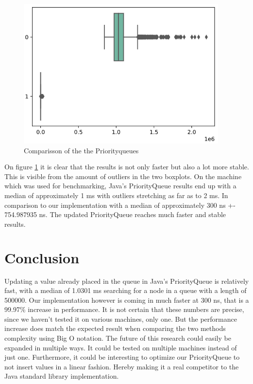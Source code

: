 \documentclass{article}
\begin{document}
\begin{figure}[H]
\includegraphics[width=300pt]{boxplot_comparisson}
\caption{Comparisson of the the Priorityqueues}
\label{img:boxplot_comparisson}
\end{figure}

On figure \ref{img:boxplot_comparisson} it is clear that the results is not only faster 
but also a lot more stable. This is visible from the amount of outliers in the two boxplots. 
On the machine which was used for benchmarking, Java's PriorityQueue results end up with a
median of approximately 1 ms with outliers stretching as far as to 2 ms. In comparison to 
our implementation with a median of approximately 300 ns +- 754.987935 ns. The updated 
PriorityQueue reaches much faster and stable results.  

\section{Conclusion} %
Updating a value already placed in the queue in Java's PriorityQueue is relatively
fast, with a median of 1.0301 ms searching for a node in a queue with a length of 
500000. Our implementation however is coming in much faster at 300 ns, that is a 99.97\% 
increase in performance. It is not certain that these numbers are precise, since we haven't 
tested it on various machines, only one. But the performance increase does match the expected result 
when comparing the two methods complexity using Big O notation. 
The future of this research could easily be expanded in multiple ways.
It could be tested on multiple machines instead of just one. Furthermore, it could be interesting
to optimize our PriorityQueue to not insert values in a linear fashion. Hereby making it a 
real competitor to the Java standard library implementation.




\end{document}
